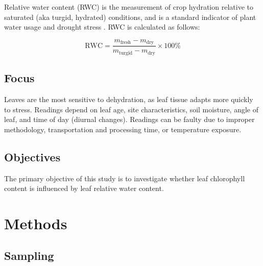 \documentclass{report}
\begin{document}

Relative water content (RWC) is the measurement of crop hydration relative to saturated (aka turgid, hydrated) conditions, and is a standard indicator of plant water usage and drought stress \parencite{drought}. RWC is calculated as follows:

\[ \text{RWC} = \frac{m_\text{fresh} - m_\text{dry}}{m_\text{turgid} - m_\text{dry}} \times 100\% \]

\subsection{Focus}

Leaves are the most sensitive to dehydration, as leaf tissue adapts more quickly to stress. Readings depend on leaf age, site characteristics, soil moisture, angle of leaf, and time of day (diurnal changes). Readings can be faulty due to improper methodology, transportation and processing time, or temperature exposure.

\subsection{Objectives}

The primary objective of this study is to investigate whether leaf chlorophyll content is influenced by leaf relative water content.

\clearpage

\section{Methods}


\subsection{Sampling}

\end{document}
